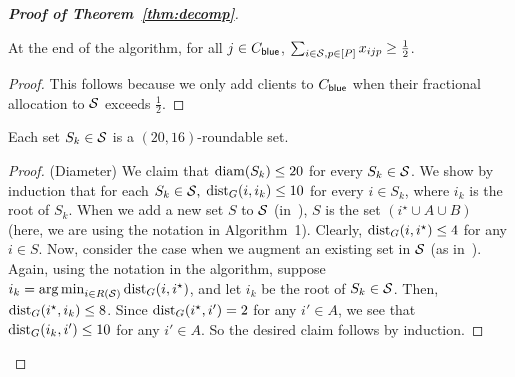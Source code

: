 \begin{proof}[{\bf Proof of Theorem~\ref{thm:decomp}}]
\begin{claim}
	At the end of the algorithm, for all $j \in C_{\mathsf{blue}}$, $\sum_{i \in {\cal S}, p \in [P]} x_{ijp} \geq \frac12$.	
\end{claim}
\begin{proof}
This follows because we only add clients to $C_{\mathsf{blue}}$ when their fractional allocation to ${\cal S}$ exceeds $\frac12$.
\end{proof}



\begin{lemma}
Each set $S_k \in {\cal S}$ is a $(20,16)$-roundable set.
\end{lemma}
\begin{proof}
(Diameter) We claim that $\mathrm{diam}(S_k) \leq 20$ for every $S_k \in {\cal S}$. We show by induction that for each $S_k \in {\cal S},$
$\mathrm{dist}_G(i,i_k) \leq 10$ for every $i \in S_k$, where $i_k$ is the root of $S_k$. When we add a new set $S$ to ${\cal S}$ (in~),
$S$ is the set $(i^\star \cup A \cup B)$ (here, we are using the notation in Algorithm~1). Clearly, $\mathrm{dist}_G(i, i^\star) \leq 4$
for any $i \in S$. Now, consider the case when we augment an existing set  in $\cal S$ (as in~). 
Again, using the notation in the algorithm, suppose $i_k = \operatorname*{arg\,min}_{i \in R({\cal S})} \mathrm{dist}_G(i, i^\star)$, and let $i_k$ be the
root of $S_k \in {\cal S}$. Then, $\mathrm{dist}_G(i^\star, i_k) \leq 8$. Since $\mathrm{dist}_G(i^\star, i') = 2$ for any $i' \in A$, we see that 
$\mathrm{dist}_G(i_k, i') \leq 10$ for any $i' \in A$. 
So the desired claim follows by induction. 
\smallskip


\end{proof}
\end{proof}
